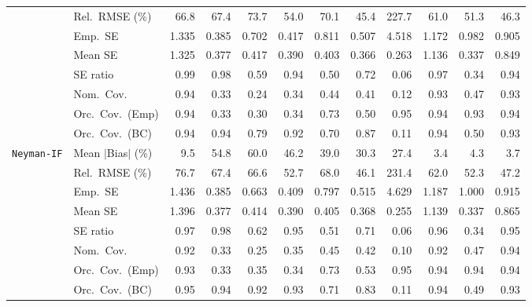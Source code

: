 \begin{landscape}
\begin{longtable}{llrrrrrrrrrr}
 & Rel.\ RMSE (\%) & 66.8 & 67.4 & 73.7 & 54.0 & 70.1 & \cellcolor{rankone}45.4 & 227.7 & 61.0 & \cellcolor{rankthree}51.3 & \cellcolor{ranktwo}46.3 \\
 & Emp.\ SE & 1.335 & 0.385 & 0.702 & 0.417 & 0.811 & 0.507 & 4.518 & 1.172 & 0.982 & 0.905 \\
 & Mean SE & 1.325 & 0.377 & 0.417 & 0.390 & 0.403 & 0.366 & 0.263 & 1.136 & 0.337 & 0.849 \\
 & SE ratio & \cellcolor{rankone}0.99 & \cellcolor{ranktwo}0.98 & 0.59 & 0.94 & 0.50 & 0.72 & 0.06 & \cellcolor{rankthree}0.97 & 0.34 & 0.94 \\
 & Nom.\ Cov. & \cellcolor{rankone}0.94 & 0.33 & 0.24 & 0.34 & 0.44 & 0.41 & 0.12 & \cellcolor{rankthree}0.93 & 0.47 & \cellcolor{ranktwo}0.93 \\
 & Orc.\ Cov.\ (Emp) & \cellcolor{ranktwo}0.94 & 0.33 & 0.30 & 0.34 & 0.73 & 0.50 & \cellcolor{rankone}0.95 & \cellcolor{rankthree}0.94 & 0.93 & 0.94 \\
 & Orc.\ Cov.\ (BC) & \cellcolor{ranktwo}0.94 & \cellcolor{rankone}0.94 & 0.79 & 0.92 & 0.70 & 0.87 & 0.11 & \cellcolor{rankthree}0.94 & 0.50 & 0.93 \\
\addlinespace[2pt]
\quad \texttt{Neyman-IF} & Mean $|$Bias$|$ (\%) & 9.5 & 54.8 & 60.0 & 46.2 & 39.0 & 30.3 & 27.4 & \cellcolor{rankone}3.4 & \cellcolor{rankthree}4.3 & \cellcolor{ranktwo}3.7 \\
 & Rel.\ RMSE (\%) & 76.7 & 67.4 & 66.6 & 52.7 & 68.0 & \cellcolor{rankone}46.1 & 231.4 & 62.0 & \cellcolor{rankthree}52.3 & \cellcolor{ranktwo}47.2 \\
 & Emp.\ SE & 1.436 & 0.385 & 0.663 & 0.409 & 0.797 & 0.515 & 4.629 & 1.187 & 1.000 & 0.915 \\
 & Mean SE & 1.396 & 0.377 & 0.414 & 0.390 & 0.405 & 0.368 & 0.255 & 1.139 & 0.337 & 0.865 \\
 & SE ratio & \cellcolor{ranktwo}0.97 & \cellcolor{rankone}0.98 & 0.62 & 0.95 & 0.51 & 0.71 & 0.06 & \cellcolor{rankthree}0.96 & 0.34 & 0.95 \\
 & Nom.\ Cov. & \cellcolor{rankthree}0.92 & 0.33 & 0.25 & 0.35 & 0.45 & 0.42 & 0.10 & \cellcolor{ranktwo}0.92 & 0.47 & \cellcolor{rankone}0.94 \\
 & Orc.\ Cov.\ (Emp) & 0.93 & 0.33 & 0.35 & 0.34 & 0.73 & 0.53 & \cellcolor{rankone}0.95 & 0.94 & \cellcolor{rankthree}0.94 & \cellcolor{ranktwo}0.94 \\
 & Orc.\ Cov.\ (BC) & \cellcolor{rankone}0.95 & \cellcolor{ranktwo}0.94 & 0.92 & 0.93 & 0.71 & 0.83 & 0.11 & \cellcolor{rankthree}0.94 & 0.49 & 0.93 \\

\end{longtable}
\end{landscape}
